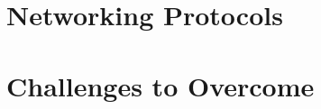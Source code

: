 \documentclass[sigplan,screen,nonacm]{acmart}
\begin{document}
\section{Networking Protocols}
\label{sec:Networking Protocols}

\section{Challenges to Overcome}
\label{sec:Challenges to Overcome}


\end{document}

